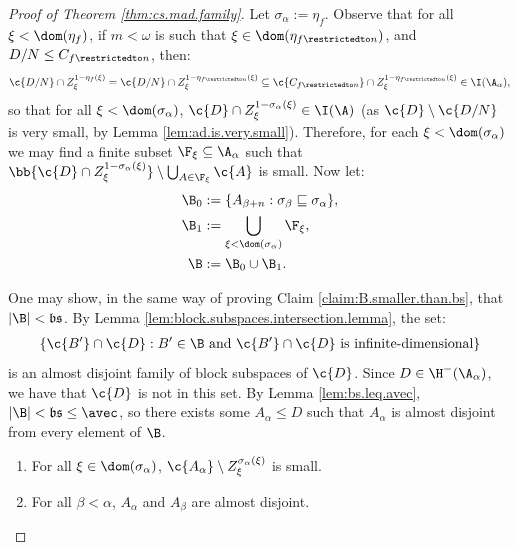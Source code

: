 \documentclass[11pt,reqno]{amsart}
\begin{document}
\begin{proof}[Proof of Theorem \ref{thm:cs.mad.family}]
    Let $\sigma_{\alpha} := \eta_f$. Observe that for all $\xi < \dom(\eta_f)$, if $m < \omega$ is such that $\xi \in \dom(\eta_{f\restrictedto n})$, and $D/N \leq C_{f\restrictedto n}$, then:
    \begin{align*}
        \c{D/N} \cap Z_\xi^{1-\eta_f(\xi)} = \c{D/N} \cap Z_\xi^{1-\eta_{f\restrictedto n}(\xi)} \subseteq \c{C_{f\restrictedto n}} \cap Z_\xi^{1-\eta_{f\restrictedto n}(\xi)} \in \I(\A_\alpha),
    \end{align*}
    so that for all $\xi < \dom(\sigma_{\alpha})$, $\c{D} \cap Z_\xi^{1-\sigma_\alpha(\xi)} \in \I(\A)$ (as $\c{D} \setminus \c{D/N}$ is very small, by Lemma \ref{lem:ad.is.very.small}). Therefore, for each $\xi < \dom(\sigma_\alpha)$ we may find a finite subset $\F_\xi \subseteq \A_\alpha$ such that $\bb{\c{D} \cap Z_\xi^{1-\sigma_\alpha(\xi)}} \setminus \bigcup_{A \in \F_\xi} \c{A}$ is small. Now let:
    \begin{align*}
        \B_0 &:= \{A_{\beta+n} : \sigma_\beta \sqsubseteq \sigma_\alpha\}, \\
        \B_1 &:= \bigcup_{\xi < \dom(\sigma_\alpha)} \F_\xi, \\
        \B &:= \B_0 \cup \B_1.
    \end{align*}

    One may show, in the same way of proving Claim \ref{claim:B.smaller.than.bs}, that $|\B| < \frak{bs}$. By Lemma \ref{lem:block.subspaces.intersection.lemma}, the set:
    \begin{align*}
        \{\c{B'} \cap \c{D} : B' \in \B \text{ and } \c{B'} \cap \c{D} \text{ is infinite-dimensional}\}
    \end{align*}
    is an almost disjoint family of block subspaces of $\c{D}$. Since $D \in \H^-(\A_\alpha)$, we have that $\c{D}$ is not in this set. By Lemma \ref{lem:bs.leq.avec}, $|\B| < \frak{bs} \leq \avec$, so there exists some $A_\alpha \leq D$ such that $A_\alpha$ is almost disjoint from every element of $\B$. 

    \begin{claim}
        \hfill
        \begin{enumerate}
            \item For all $\xi \in \dom(\sigma_\alpha)$, $\c{A_\alpha} \setminus Z_\xi^{\sigma_\alpha(\xi)}$ is small.

            \item For all $\beta < \alpha$, $A_\alpha$ and $A_\beta$ are almost disjoint.
        \end{enumerate}
    \end{claim}


\end{proof}
\end{document}
